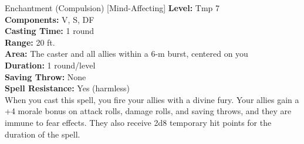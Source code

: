 {Enchantment (Compulsion) [Mind-Affecting]}
{
	\textbf{Level:}
	Tmp 7\\
	\textbf{Components:}
	V, S, DF\\
	\textbf{Casting Time:}
	1 round\\
	\textbf{Range:}
	20 ft.\\
	\textbf{Area:}
	The caster and all allies within a 6-m burst, centered on you\\
	\textbf{Duration:}
	1 round/level\\
	\textbf{Saving Throw:}
	None\\
	\textbf{Spell Resistance:}
	Yes (harmless)\\
}
{
	When you cast this spell, you fire your allies with a divine fury. Your allies gain a +4 morale bonus on attack rolls, damage rolls, and saving throws, and they are immune to fear effects. They also receive 2d8 temporary hit points for the duration of the spell.
}
